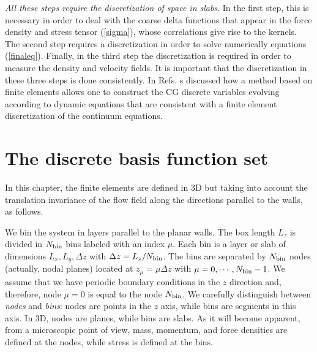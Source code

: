 \documentclass[b5paper,openright,10pt]{book}
\begin{document}
\textit{All  these  steps  require  the  discretization  of  space  in
  slabs}. In the  first step, this is necessary in  order to deal with
the coarse delta functions that appear  in the force density and stress
  tensor (\ref{sigma}), whose correlations give  rise to the kernels. The
second step  requires a discretization  in order to  solve numerically
equations  (\ref{finaleq}).  Finally, in  the third step the discretization
is required in  order to measure the density and  velocity fields.  It
is  important that  the discretization  in these  three steps  is done
consistently. In Refs. \cite{DelaTorre2015,EspanolDonev2015} s discussed how  a method based
on  finite elements  allows one  to construct  the  CG discrete  variables
evolving according  to dynamic  equations that  are consistent  with a
finite  element  discretization of  the  continuum  equations. 


\section{The discrete basis function set}
\label{Sec:DiscreteBasis}
In this chapter, the finite elements are defined in 3D but taking into account the
translation invariance of the flow field along the directions parallel to the walls, as follows.

We bin  the system  in layers  parallel to the  planar walls.   The box
length $L_z$ is  divided in $N_{\rm bin}$ bins labeled  with an index
$\mu$.  Each bin  is a layer or slab of  dimensions $L_x,L_y,\Delta z$
with $\Delta  z=L_z/N_{\rm bin}$.  The  bins are separated  by $N_{\rm
  bin}$ nodes  (actually, nodal  planes) located at  $z_\mu=\mu \Delta
z$  with $\mu=0,\cdots,N_{\rm bin}-1$.   We assume  that we  have periodic
boundary  conditions  in  the  $z$ direction  and,  therefore,  node
$\mu=0$ is equal to the  node $N_{\rm bin}$.  We carefully distinguish
between \textit{nodes} and \textit{bins}: nodes  are points in the $z$
axis, while bins are segments in  this axis.  In 3D, nodes are planes,
while bins are slabs.  As it  will become apparent, from a microscopic
point of view, mass, momentum, and  force densities are defined at the
nodes, while stress is defined at the bins.
\end{document}
